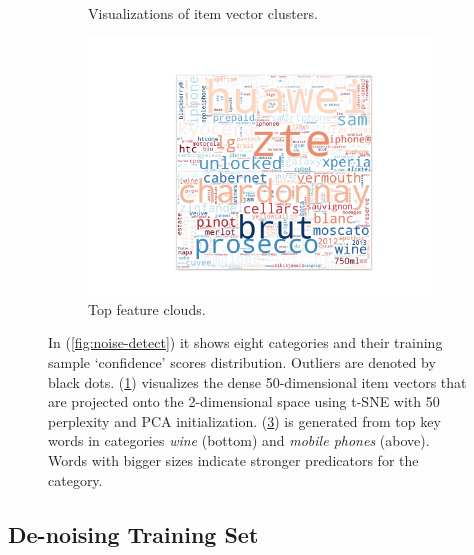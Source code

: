 \begin{figure}[th]
\begin{subfigure}[b]{0.33\textwidth}
   \caption{Visualizations of item vector clusters.  }
   \label{fig:cluster}
\end{subfigure}
\begin{subfigure}[b]{0.3\textwidth}
   \includegraphics[width=\textwidth]{resources/wc}
   \caption{Top feature clouds.}
   \label{fig:wc}
\end{subfigure}
\caption{In (\ref{fig:noise-detect}) it shows eight categories and their training sample `confidence' scores distribution. Outliers are denoted by black dots. (\ref{fig:cluster}) visualizes the dense 50-dimensional item vectors that are projected onto the 2-dimensional space using t-SNE with 50 perplexity and PCA initialization. (\ref{fig:wc}) is generated from top key words in categories \emph{wine} (bottom) and \emph{mobile phones} (above). Words with bigger sizes indicate stronger predicators for the category.}
\end{figure}

\subsection{De-noising Training Set} %
\label{sub:de_noising_training_sample}

